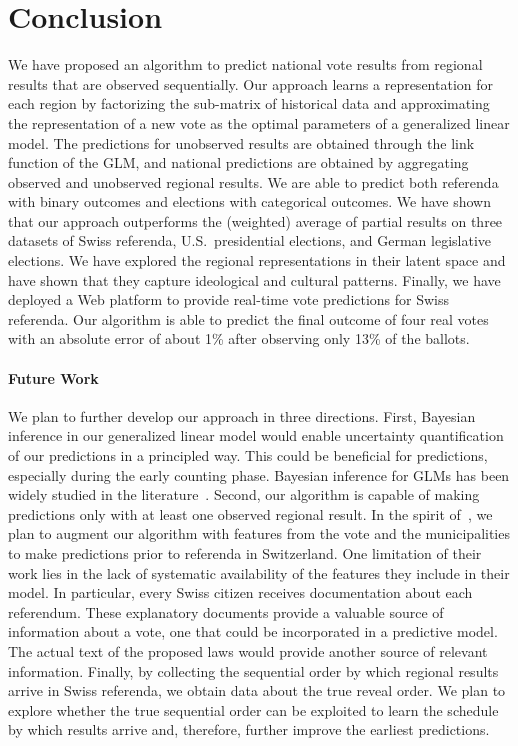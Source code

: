 \section{Conclusion}%
\label{pdk:sec:conclusion}

We have proposed an algorithm to predict national vote results from regional results that are observed sequentially.
Our approach learns a representation for each region by factorizing the sub-matrix of historical data and approximating the representation of a new vote as the optimal parameters of a generalized linear model.
The predictions for unobserved results are obtained through the link function of the GLM, and national predictions are obtained by aggregating observed and unobserved regional results.
We are able to predict both referenda with binary outcomes and elections with categorical outcomes.
We have shown that our approach outperforms the (weighted) average of partial results on three datasets of Swiss referenda, U.S.\ presidential elections, and German legislative elections.
We have explored the regional representations in their latent space and have shown that they capture ideological and cultural patterns.
Finally, we have deployed a Web platform to provide real-time vote predictions for Swiss referenda.
Our algorithm is able to predict the final outcome of four real votes with an absolute error of about 1\% after observing only 13\% of the ballots.

\paragraph{Future Work}

We plan to further develop our approach in three directions.
First, Bayesian inference in our generalized linear model would enable uncertainty quantification of our predictions in a principled way.
This could be beneficial for predictions, especially during the early counting phase.
Bayesian inference for GLMs has been widely studied in the literature~\citep{murphy2012machine}.
Second, our algorithm is capable of making predictions only with at least one observed regional result.
In the spirit of~\citet{etter2016online}, we plan to augment our algorithm with features from the vote and the municipalities to make predictions prior to referenda in Switzerland.
One limitation of their work lies in the lack of systematic availability of the features they include in their model.
In particular, every Swiss citizen receives documentation about each referendum.
These explanatory documents provide a valuable source of information about a vote, one that could be incorporated in a predictive model.
The actual text of the proposed laws would provide another source of relevant information.
Finally, by collecting the sequential order by which regional results arrive in Swiss referenda, we obtain data about the true reveal order.
We plan to explore whether the true sequential order can be exploited to learn the schedule by which results arrive and, therefore, further improve the earliest predictions.
